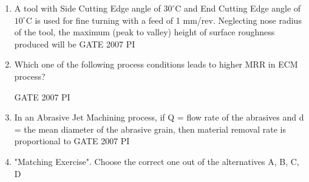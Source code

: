 \documentclass[journal,12pt,onecolumn]{IEEEtran}
\theoremstyle{remark}
\begin{document}
\begin{enumerate}
\item
	A tool with Side Cutting Edge angle of $30^\circ\mathrm{C}$
 and End Cutting Edge angle of $10^\circ\mathrm{C}$
 is used for fine turning with a feed of 1 mm/rev. Neglecting nose radius of the tool, the maximum (peak to valley) height of surface roughness produced will be
 \hfill{GATE 2007 PI}
 \begin{enumerate}
      \end{enumerate}
      
      \item
	Which one of the following process conditions leads to higher MRR in ECM process?
    
    \hfill{GATE 2007 PI}
    \begin{enumerate}
    \end{enumerate}
    
    \item
     In an Abrasive Jet Machining process, if Q = flow rate of the abrasives and d = the mean diameter of the abrasive grain, then material removal rate is proportional to
     \hfill{GATE 2007 PI}
     \begin{enumerate}
\end{enumerate}

\item
"Matching Exercise". Choose the correct one out of the alternatives A, B, C, D


\end{enumerate}
\end{document}
